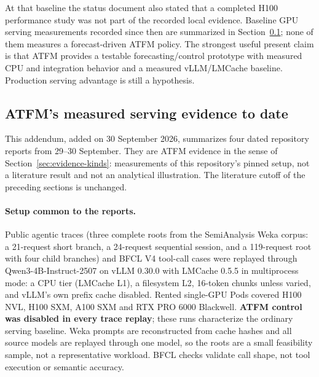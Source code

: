 At that baseline the status document also stated that a completed H100
performance study was not part of the recorded local evidence. Baseline GPU
serving measurements recorded since then are summarized in
Section~\ref{sec:measured}; none of them measures a forecast-driven ATFM policy.
The strongest useful present claim is that ATFM provides a testable
forecasting/control prototype with measured CPU and integration behavior and a
measured vLLM/LMCache baseline. Production serving advantage is still a hypothesis.

\subsection{ATFM's measured serving evidence to date}
\label{sec:measured}
This addendum, added on 30 September 2026, summarizes four dated repository
reports from 29--30 September. They are ATFM evidence in the sense of
Section~\ref{sec:evidence-kinds}: measurements of this repository's pinned
setup, not a literature result and not an analytical illustration. The
literature cutoff of the preceding sections is unchanged.

\paragraph{Setup common to the reports.}
Public agentic traces (three complete roots from the SemiAnalysis Weka corpus:
a 21-request short branch, a 24-request sequential session, and a 119-request
root with four child branches) and BFCL V4 tool-call cases were replayed through
Qwen3-4B-Instruct-2507 on vLLM 0.30.0 with LMCache 0.5.5 in multiprocess mode:
a CPU tier (LMCache L1), a filesystem L2, 16-token chunks unless varied, and
vLLM's own prefix cache disabled. Rented single-GPU Pods covered H100 NVL, H100
SXM, A100 SXM and RTX PRO 6000 Blackwell. \textbf{ATFM control was disabled in
every trace replay}; these runs characterize the ordinary serving baseline.
Weka prompts are reconstructed from cache hashes and all source models are
replayed through one model, so the roots are a small feasibility sample, not a
representative workload. BFCL checks validate call shape, not tool execution or
semantic accuracy.

